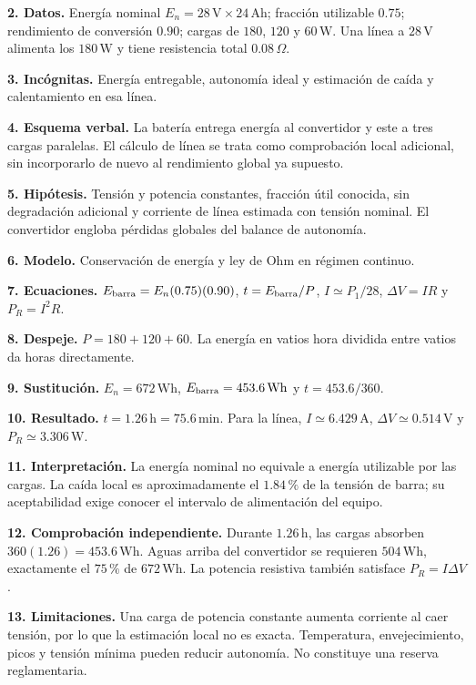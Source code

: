 \textbf{2. Datos.} Energía nominal $E_n=28\,\mathrm{V}\times24\,\mathrm{Ah}$; fracción utilizable $0.75$; rendimiento de conversión $0.90$; cargas de $180$, $120$ y $60\,\mathrm{W}$. Una línea a $28\,\mathrm{V}$ alimenta los $180\,\mathrm{W}$ y tiene resistencia total $0.08\,\Omega$.

\textbf{3. Incógnitas.} Energía entregable, autonomía ideal y estimación de caída y calentamiento en esa línea.

\textbf{4. Esquema verbal.} La batería entrega energía al convertidor y este a tres cargas paralelas. El cálculo de línea se trata como comprobación local adicional, sin incorporarlo de nuevo al rendimiento global ya supuesto.

\textbf{5. Hipótesis.} Tensión y potencia constantes, fracción útil conocida, sin degradación adicional y corriente de línea estimada con tensión nominal. El convertidor engloba pérdidas globales del balance de autonomía.

\textbf{6. Modelo.} Conservación de energía y ley de Ohm en régimen continuo.

\textbf{7. Ecuaciones.} $E_{\rm barra}=E_n(0.75)(0.90)$, $t=E_{\rm barra}/P$, $I\simeq P_1/28$, $\Delta V=IR$ y $P_R=I^2R$.

\textbf{8. Despeje.} $P=180+120+60$. La energía en vatios hora dividida entre vatios da horas directamente.

\textbf{9. Sustitución.} $E_n=672\,\mathrm{Wh}$, $E_{\rm barra}=453.6\,\mathrm{Wh}$ y $t=453.6/360$.

\textbf{10. Resultado.} $t=1.26\,\mathrm{h}=75.6\,\mathrm{min}$. Para la línea, $I\simeq6.429\,\mathrm{A}$, $\Delta V\simeq0.514\,\mathrm{V}$ y $P_R\simeq3.306\,\mathrm{W}$.

\textbf{11. Interpretación.} La energía nominal no equivale a energía utilizable por las cargas. La caída local es aproximadamente el $1.84\,\text{\%}$ de la tensión de barra; su aceptabilidad exige conocer el intervalo de alimentación del equipo.

\textbf{12. Comprobación independiente.} Durante $1.26\,\mathrm{h}$, las cargas absorben $360(1.26)=453.6\,\mathrm{Wh}$. Aguas arriba del convertidor se requieren $504\,\mathrm{Wh}$, exactamente el $75\,\text{\%}$ de $672\,\mathrm{Wh}$. La potencia resistiva también satisface $P_R=I\Delta V$.

\textbf{13. Limitaciones.} Una carga de potencia constante aumenta corriente al caer tensión, por lo que la estimación local no es exacta. Temperatura, envejecimiento, picos y tensión mínima pueden reducir autonomía. No constituye una reserva reglamentaria.

